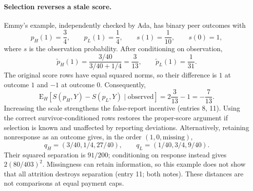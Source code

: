 \documentclass{article}
\begin{document}
\paragraph{Selection reverses a stale score.}
Emmy's example, independently checked by Ada, has binary peer outcomes with
\[
 p_H(1)=\frac34,\qquad p_L(1)=\frac14,
 \qquad s(1)=\frac1{10},\qquad s(0)=1,
\]
where \(s\) is the observation probability.
After conditioning on observation,
\[
 \widetilde p_H(1)=\frac{3/40}{3/40+1/4}=\frac3{13},
 \qquad \widetilde p_L(1)=\frac1{31}.
\]
The original score rows have equal squared norms, so their difference is
\(1\) at outcome \(1\) and \(-1\) at outcome \(0\).
Consequently,
\[
 \mathrm{E}_H[S(p_H,Y)-S(p_L,Y)\mid\text{observed}]
 =2\frac3{13}-1=-\frac7{13}.
\]
Increasing the scale strengthens the false-report incentive (entries 8, 11).
Using the correct survivor-conditioned rows restores the proper-score argument if selection is known
and unaffected by reporting deviations.
Alternatively, retaining nonresponse as an outcome gives, in the order \((1,0,\text{missing})\),
\[
 q_H=(3/40,1/4,27/40),\qquad q_L=(1/40,3/4,9/40).
\]
Their squared separation is \(91/200\); conditioning on response instead gives
\(2(80/403)^2\).
Missingness can retain information, so this example does not show that all attrition destroys
separation (entry 11; both notes).
These distances are not comparisons at equal payment caps.
\end{document}
